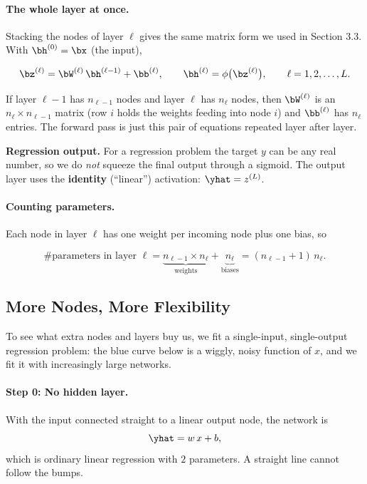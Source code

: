 \documentclass[12pt, a4paper]{article}
\begin{document}
\paragraph{The whole layer at once.}
Stacking the nodes of layer $\ell$ gives the same matrix form we used in
Section 3.3. With $\bh^{(0)} = \bx$ (the input),
\begin{resultbox}
  \[
    \bz^{(\ell)} = \bW^{(\ell)}\,\bh^{(\ell-1)} + \bb^{(\ell)},
    \qquad
    \bh^{(\ell)} = \phi\bigl(\bz^{(\ell)}\bigr),
    \qquad \ell = 1, 2, \dots, L.
  \]
\end{resultbox}
If layer $\ell-1$ has $n_{\ell-1}$ nodes and layer $\ell$ has $n_\ell$ nodes,
then $\bW^{(\ell)}$ is an $n_\ell \times n_{\ell-1}$ matrix (row $i$ holds the
weights feeding into node $i$) and $\bb^{(\ell)}$ has $n_\ell$ entries.
The forward pass is just this pair of equations repeated layer after layer.

\begin{notebox}
  \textbf{Regression output.} For a regression problem the target $y$ can be
  any real number, so we do \emph{not} squeeze the final output through a
  sigmoid. The output layer uses the \textbf{identity} (``linear'')
  activation: $\yhat = z^{(L)}$.
\end{notebox}

\paragraph{Counting parameters.}
Each node in layer $\ell$ has one weight per incoming node plus one bias, so
\begin{resultbox}
  \[
    \#\text{parameters in layer } \ell
    = \underbrace{n_{\ell-1} \times n_\ell}_{\text{weights}}
    + \underbrace{n_\ell}_{\text{biases}}
    = (n_{\ell-1} + 1)\, n_\ell .
  \]
\end{resultbox}

\subsection{More Nodes, More Flexibility}
\label{sec:flexibility}

To see what extra nodes and layers buy us, we fit a single-input,
single-output regression problem: the blue curve below is a wiggly,
noisy function of $x$, and we fit it with increasingly large networks.

\paragraph{Step 0: No hidden layer.}
With the input connected straight to a linear output node, the network is
\[
  \yhat = w\,x + b,
\]
which is ordinary linear regression with $2$ parameters. A straight line
cannot follow the bumps.
\end{document}
